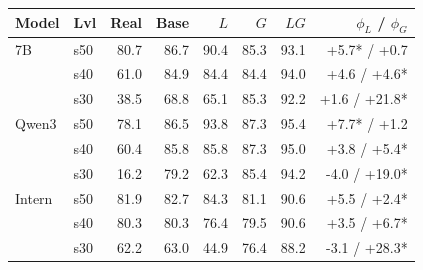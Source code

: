 \begin{tabular}{@{}llrrrrrr@{}}
\toprule
Model & Lvl & Real & Base & $L$ & $G$ & $LG$ & $\phi_L$ / $\phi_G$ \\
\midrule
7B & s50 & 80.7 & 86.7 & 90.4 & 85.3 & 93.1 & +5.7* / +0.7 \\
 & s40 & 61.0 & 84.9 & 84.4 & 84.4 & 94.0 & +4.6 / +4.6* \\
 & s30 & 38.5 & 68.8 & 65.1 & 85.3 & 92.2 & +1.6 / +21.8* \\
Qwen3 & s50 & 78.1 & 86.5 & 93.8 & 87.3 & 95.4 & +7.7* / +1.2 \\
 & s40 & 60.4 & 85.8 & 85.8 & 87.3 & 95.0 & +3.8 / +5.4* \\
 & s30 & 16.2 & 79.2 & 62.3 & 85.4 & 94.2 & -4.0 / +19.0* \\
Intern & s50 & 81.9 & 82.7 & 84.3 & 81.1 & 90.6 & +5.5 / +2.4* \\
 & s40 & 80.3 & 80.3 & 76.4 & 79.5 & 90.6 & +3.5 / +6.7* \\
 & s30 & 62.2 & 63.0 & 44.9 & 76.4 & 88.2 & -3.1 / +28.3* \\
\bottomrule
\end{tabular}
